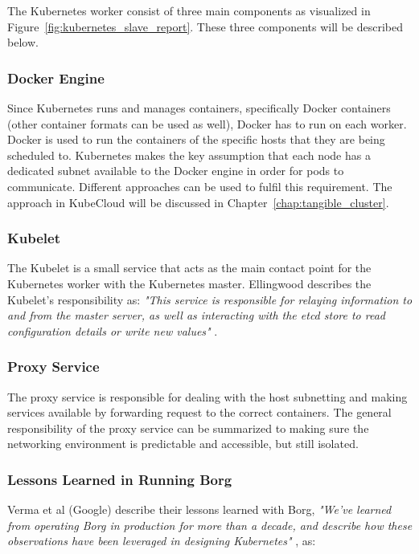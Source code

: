 \noindent The Kubernetes worker consist of three main components as visualized in Figure~\ref{fig:kubernetes_slave_report}. These three components will be described below.

\subsubsection*{Docker Engine}
Since Kubernetes runs and manages containers, specifically Docker containers (other container formats can be used as well), Docker has to run on each worker. Docker is used to run the containers of the specific hosts that they are being scheduled to. Kubernetes makes the key assumption that each node has a dedicated subnet available to the Docker engine in order for pods to communicate. Different approaches can be used to fulfil this requirement. The approach in KubeCloud will be discussed in Chapter~\ref{chap:tangible_cluster}.

\subsubsection*{Kubelet}
The Kubelet is a small service that acts as the main contact point for the Kubernetes worker with the Kubernetes master. Ellingwood describes the Kubelet's responsibility as: \textit{"This service is responsible for relaying information to and from the master server, as well as interacting with the etcd store to read configuration details or write new values"} \cite[p. 5]{digitalocean2014kubernetes}.


\subsubsection*{Proxy Service}
The proxy service is responsible for dealing with the host subnetting and making services available by forwarding request to the correct containers. The general responsibility of the proxy service can be summarized to making sure the networking environment is predictable and accessible, but still isolated.


\subsubsection*{Lessons Learned in Running Borg}
Verma et al (Google) describe their lessons learned with Borg, \textit{"We've learned from operating Borg in production for more than a decade, and describe how these observations have been leveraged in designing Kubernetes"} \cite[p. 13]{verma2015borg}, as:

